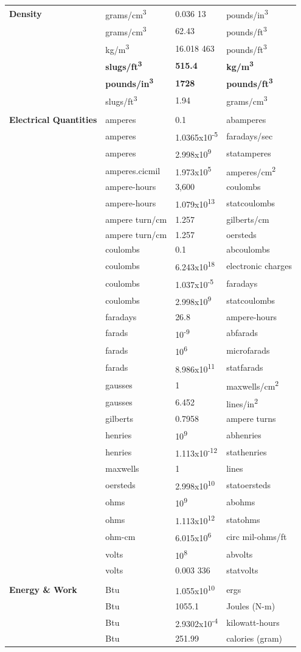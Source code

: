 \documentclass[
]{book}
\begin{document}
\begin{longtable}[]{@{}llll@{}}
\textbf{Density} & grams/cm\textsuperscript{3} & 0.036 13 & pounds/in\textsuperscript{3}\tabularnewline
& grams/cm\textsuperscript{3} & 62.43 & pounds/ft\textsuperscript{3}\tabularnewline
& kg/m\textsuperscript{3} & 16.018 463 & pounds/ft\textsuperscript{3}\tabularnewline
& \textbf{slugs/ft\textsuperscript{3}} & \textbf{515.4} & \textbf{kg/m\textsuperscript{3}}\tabularnewline
& \textbf{pounds/in\textsuperscript{3}} & \textbf{1728} & \textbf{pounds/ft\textsuperscript{3}}\tabularnewline
& slugs/ft\textsuperscript{3} & 1.94 & grams/cm\textsuperscript{3}\tabularnewline
& & &\tabularnewline
\textbf{Electrical Quantities} & amperes & 0.1 & abamperes\tabularnewline
& amperes & 1.0365x10\textsuperscript{-5} & faradays/sec\tabularnewline
& amperes & 2.998x10\textsuperscript{9} & statamperes\tabularnewline
& amperes.cicmil & 1.973x10\textsuperscript{5} & amperes/cm\textsuperscript{2}\tabularnewline
& ampere-hours & 3,600 & coulombs\tabularnewline
& ampere-hours & 1.079x10\textsuperscript{13} & statcoulombs\tabularnewline
& ampere turn/cm & 1.257 & gilberts/cm\tabularnewline
& ampere turn/cm & 1.257 & oersteds\tabularnewline
& coulombs & 0.1 & abcoulombs\tabularnewline
& coulombs & 6.243x10\textsuperscript{18} & electronic charges\tabularnewline
& coulombs & 1.037x10\textsuperscript{-5} & faradays\tabularnewline
& coulombs & 2.998x10\textsuperscript{9} & statcoulombs\tabularnewline
& faradays & 26.8 & ampere-hours\tabularnewline
& farads & 10\textsuperscript{-9} & abfarads\tabularnewline
& farads & 10\textsuperscript{6} & microfarads\tabularnewline
& farads & 8.986x10\textsuperscript{11} & statfarads\tabularnewline
& gausses & 1 & maxwells/cm\textsuperscript{2}\tabularnewline
& gausses & 6.452 & lines/in\textsuperscript{2}\tabularnewline
& gilberts & 0.7958 & ampere turns\tabularnewline
& henries & 10\textsuperscript{9} & abhenries\tabularnewline
& henries & 1.113x10\textsuperscript{-12} & stathenries\tabularnewline
& maxwells & 1 & lines\tabularnewline
& oersteds & 2.998x10\textsuperscript{10} & statoersteds\tabularnewline
& ohms & 10\textsuperscript{9} & abohms\tabularnewline
& ohms & 1.113x10\textsuperscript{12} & statohms\tabularnewline
& ohm-cm & 6.015x10\textsuperscript{6} & circ mil-ohms/ft\tabularnewline
& volts & 10\textsuperscript{8} & abvolts\tabularnewline
& volts & 0.003 336 & statvolts\tabularnewline
& & &\tabularnewline
\textbf{Energy \& Work} & Btu & 1.055x10\textsuperscript{10} & ergs\tabularnewline
& Btu & 1055.1 & Joules (N-m)\tabularnewline
& Btu & 2.9302x10\textsuperscript{-4} & kilowatt-hours\tabularnewline
& Btu & 251.99 & calories (gram)\tabularnewline

\end{longtable}
\end{document}
